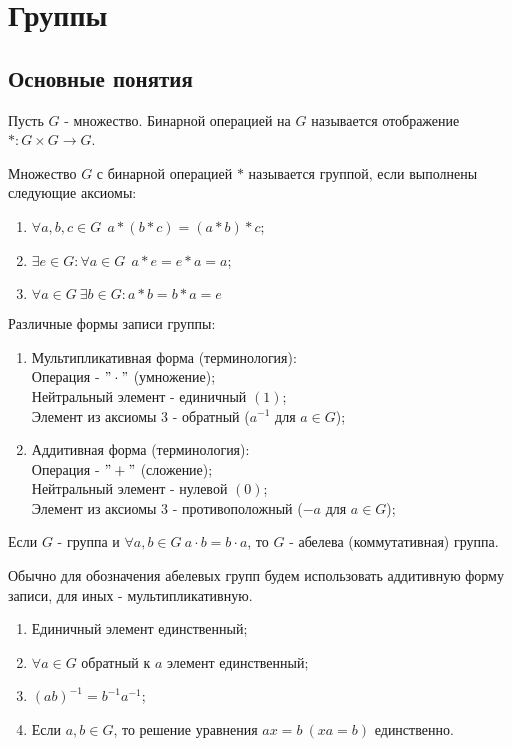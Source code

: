 \section{Группы}
\subsection{Основные понятия}
\begin{definition}
    Пусть $G$ - множество. Бинарной операцией на $G$ называется отображение $*: G \times G \rightarrow G$.
\end{definition}
\begin{definition}
    Множество $G$ с бинарной операцией $*$ называется группой, если выполнены следующие аксиомы:
    \begin{enumerate}
        \item $\forall a, b, c \in G \ \ a * (b * c) = (a * b) * c$;
        \item $\exists e \in G: \forall a \in G \ \ a * e = e * a = a$;
        \item $\forall a \in G \ \exists b \in G: a * b = b * a = e$
    \end{enumerate}
\end{definition}
Различные формы записи группы:
\begin{enumerate}
    \item Мультипликативная форма (терминология):\\
    Операция - $"\cdot"$ (умножение);\\
    Нейтральный элемент - единичный $(1)$;\\
    Элемент из аксиомы 3 - обратный ($a^{-1}$ для $a \in G$);
    \item Аддитивная форма (терминология):\\
    Операция - $"+"$ (сложение);\\
    Нейтральный элемент - нулевой $(0)$;\\
    Элемент из аксиомы 3 - противоположный ($-a$ для $a \in G$);
\end{enumerate}
\begin{definition}
    Если $G$ - группа и $\forall a, b \in G \ a \cdot b = b \cdot a$, то $G$ - абелева (коммутативная) группа. 
\end{definition}
\begin{remark}
    Обычно для обозначения абелевых групп будем использовать аддитивную форму записи, для иных - мультипликативную.
\end{remark}
\begin{subtheorem} \tab
    \begin{enumerate}
        \item Единичный элемент единственный;
        \item $\forall a \in G$ обратный к $a$ элемент единственный;
        \item $(ab)^{-1} = b^{-1}a^{-1}$;
        \item Если $a, b \in G$, то решение уравнения $ax = b \ (xa = b)$ единственно.
    \end{enumerate}
\end{subtheorem}
